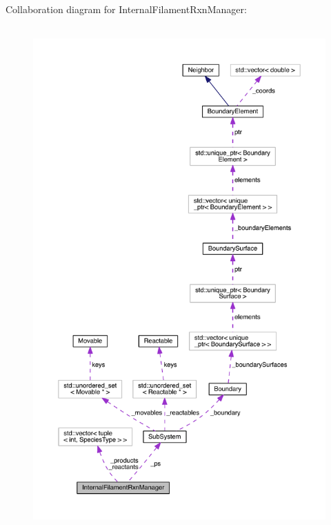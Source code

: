 Collaboration diagram for Internal\+Filament\+Rxn\+Manager\+:\nopagebreak
\begin{figure}[H]
\begin{center}
\leavevmode
\includegraphics[height=550pt]{classInternalFilamentRxnManager__coll__graph}
\end{center}
\end{figure}
